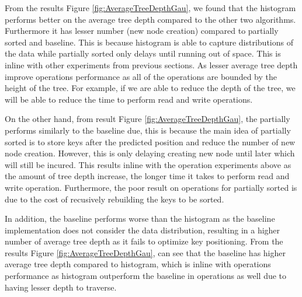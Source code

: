 From the results Figure \ref{fig:AverageTreeDepthGau}, we found that the histogram performs better on the average tree depth compared to the other two algorithms. Furthermore it has lesser \conflict number (new node creation) compared to partially sorted and baseline. This is because histogram is able to capture distributions of the data while partially sorted only delays \conflict until running out of space. This is inline with other experiments from previous sections. As lesser average tree depth improve operations performance as all of the operations are bounded by the height of the tree. For example, if we are able to reduce the depth of the tree, we will be able to reduce the time to perform read and write operations.

On the other hand, from result Figure \ref{fig:AverageTreeDepthGau}, the partially performs similarly to the baseline due, this is because the main idea of partially sorted is to store keys after the predicted position and reduce the number of new node creation. However, this is only delaying creating new node until later which will still be incured. This results inline with the operation experiments above as the amount of tree depth increase, the longer time it takes to perform read and write operation. Furthermore, the poor result on operations for partially sorted is due to the cost of recusively rebuilding the keys to be sorted.


In addition, the baseline performs worse than the histogram as the baseline implementation does not consider the data distribution, resulting in a higher number of average tree depth as it fails to optimize key positioning. From the results Figure \ref{fig:AverageTreeDepthGau}, can see that the baseline has higher average tree depth compared to histogram, which is inline with operations performance as histogram outperform the baseline in operations as well due to having lesser depth to traverse.



